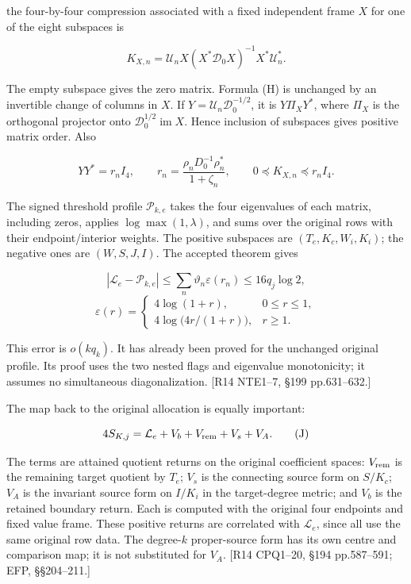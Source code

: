 the four-by-four compression associated with a fixed independent frame \(X\) for one of the eight subspaces is

\[
K_{X,n}=\mathcal U_nX(X^*\mathcal D_0X)^{-1}X^*\mathcal U_n^*.
\tag{H}
\]

The empty subspace gives the zero matrix. Formula (H) is unchanged by an invertible change of columns in \(X\). If \(Y=\mathcal U_n\mathcal D_0^{-1/2}\), it is \(Y\Pi_XY^*\), where \(\Pi_X\) is the orthogonal projector onto \(\mathcal D_0^{1/2}\operatorname{im}X\). Hence inclusion of subspaces gives positive matrix order. Also

\[
YY^*=r_nI_4,\qquad
r_n=\frac{\rho_nD_0^{-1}\rho_n^*}{1+\zeta_n},
\qquad0\preceq K_{X,n}\preceq r_nI_4.
\]

The signed threshold profile \(\mathcal P_{k,e}\) takes the four eigenvalues of each matrix, including zeros, applies \(\log\max(1,\lambda)\), and sums over the original rows with their endpoint/interior weights. The positive subspaces are \((T_e,K_c,W_i,K_i)\); the negative ones are \((W,S,J,I)\). The accepted theorem gives

\[
|\mathcal L_e-\mathcal P_{k,e}|
\le\sum_n\vartheta_n\varepsilon(r_n)\le16q_j\log2,
\] \[
\varepsilon(r)=
\begin{cases}
4\log(1+r),&0\le r\le1,\\
4\log\bigl(4r/(1+r)\bigr),&r\ge1.
\end{cases}
\tag{I}
\]

This error is \(o(kq_k)\). It has already been proved for the unchanged original profile. Its proof uses the two nested flags and eigenvalue monotonicity; it assumes no simultaneous diagonalization. {[}R14 NTE1--7, §199 pp.631--632.{]}

The map back to the original allocation is equally important:

\[
4S_{K,j}=\mathcal L_e+V_b+V_{\rm rem}+V_s+V_A.
\tag{J}
\]

The terms are attained quotient returns on the original coefficient spaces: \(V_{\rm rem}\) is the remaining target quotient by \(T_e\); \(V_s\) is the connecting source form on \(S/K_c\); \(V_A\) is the invariant source form on \(I/K_i\) in the target-degree metric; and \(V_b\) is the retained boundary return. Each is computed with the original four endpoints and fixed value frame. These positive returns are correlated with \(\mathcal L_e\), since all use the same original row data. The degree-\(k\) proper-source form has its own centre and comparison map; it is not substituted for \(V_A\). {[}R14 CPQ1--20, §194 pp.587--591; EFP, §§204--211.{]}


